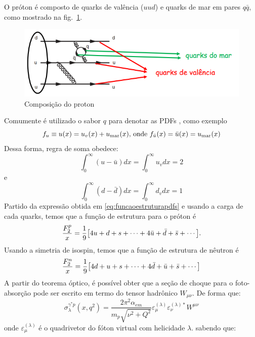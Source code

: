 O  próton é composto de quarks de valência ($uud$) e quarks de mar em pares $q\bar{q}$, como mostrado na fig.~\ref{fig:proton}.
\begin{figure}[!ht]
    \centering
    \includegraphics[scale = 0.5]{screenshot/captura20240516011725.png}
    \caption{Composição do proton}
    \label{fig:proton}
\end{figure}
Comumente é utilizado o sabor $q$ para denotar as PDFs , como exemplo
\begin{equation}
    f_u \equiv u(x) = u_v(x) + u_\text{mar}(x) \text{, onde} ~ f_{\bar{u}}(x) = \Bar{u}(x) = u_\text{mar}(x)
\end{equation}
Dessa forma, regra de soma obedece:
\begin{equation}
    \int^\infty_0 (u - \bar{u}) dx =\int^\infty_0 u_v dx= 2
\end{equation}
e
\begin{equation}
    \int^\infty_0 (d - \bar{d}) dx = \int^\infty_0 d_v dx = 1
\end{equation}
Partido da expressão obtida em \eqref{eq:funcaoestruturapdfs} e usando a carga de cada quarks, temos que a função de estrutura para o próton é
\begin{equation}
    \frac{F_2^p}{x} = \frac{1}{9}\qty[4u + d + s + \cdots + 4\bar{u} + \bar{d} + \bar{s} + \cdots ] .
\end{equation}
Usando a simetria de isospin, temos que a função de estrutura de nêutron é
\begin{equation}
    \frac{F_2^n}{x} = \frac{1}{9}\qty[4d + u + s + \cdots + 4\bar{d} + \bar{u} + \bar{s} + \cdots ]
\end{equation}
A partir do teorema óptico, é possível obter que a seção de choque para o foto-absorção  pode ser escrito em termo do tensor hadrônico $W_{\mu\nu}$. De forma que:
\begin{equation}
    \sigma ^{\gamma^* p}_\lambda (x, q^2) = \frac{2\pi^2 \alpha_{em}}{m_p\sqrt{\nu^2 + Q^2}} \varepsilon^{(\lambda)}_\mu \varepsilon_\nu^{(\lambda)*} W^{\mu\nu}
\end{equation}
onde $\varepsilon^{(\lambda)}_\mu$ é o quadrivetor do fóton virtual com helicidade $\lambda$. sabendo que:
